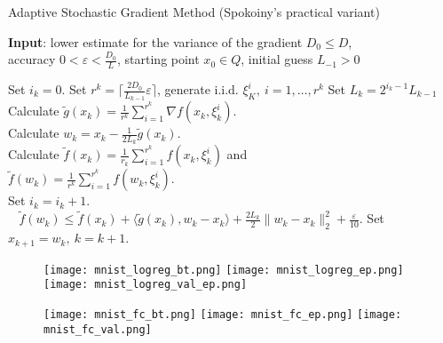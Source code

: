 \documentclass[a4paper,12pt]{article}
\theoremstyle{plain} %
\theoremstyle{definition} %
\theoremstyle{remark} %
\theoremstyle{definition}
\theoremstyle{definition}
\let\epsilon\varepsilon
\begin{document}
	\begin{algorithm}[h!]
		\caption{Adaptive Stochastic Gradient Method (Spokoiny's practical variant)}
		\hspace*{\algorithmicindent} \textbf{Input}: lower estimate for the variance of the gradient $D_0 \le D$,\\ accuracy $0 < \varepsilon< \frac{D_0}{L}$, starting point $x_0 \in Q$, initial guess $L_{-1} > 0$
		\label{RKalg}
		\begin{algorithmic}[1] 
			\STATE Set $i_k=0$. Set $r^k = \lceil \frac{2 D_0}{L_{k-1}} {\varepsilon}\rceil$, generate i.i.d. $\xi^i_K, ~i = 1,\dots, r^k$
			\REPEAT
			\STATE Set $L_k = 2 ^{i_k-1}L_{k-1}$
			\\
			\STATE Calculate $\tilde{g}(x_k) = \frac{1}{r^k}\sum_{i=1}^{r^k}\nabla f(x_k, \xi^i_k)$.
			\\
			\STATE Calculate $w_k = x_k - \frac{1}{2 L_k}\tilde{g}(x_k)$.
			\\
			\STATE Calculate $\tilde{f}(x_k) = \frac{1}{r_k}\sum_{i=1}^{r^k}f(x_k, \xi^i_k)$ and\\ $\tilde{f}(w_k) = \frac{1}{r^k}\sum_{i=1}^{r^k}f(w_k, \xi^i_k)$.
			\\
			\STATE Set $i_k = i_k + 1$.
			\UNTIL \\$~~~~\tilde{f}(w_k) \le \tilde{f}(x_k) + \langle\tilde{g}(x_k), w_k - x_k\rangle + \frac{2 L_k}{2}\|w_k - x_k\|_2^2 + \frac{\epsilon}{10}$.
			\STATE Set $x_{k+1} = w_k,~k=k+1$.
			\ENDFOR
		\end{algorithmic}
	\end{algorithm}
	
	
	
	\newpage
	
	\begin{figure}[!htb]
		\texttt{[image: mnist\_logreg\_bt.png]}
		\endminipage\hfill
		\texttt{[image: mnist\_logreg\_ep.png]}
		\endminipage\hfill
		\texttt{[image: mnist\_logreg\_val\_ep.png]}
		\endminipage
	\end{figure}
	
	\begin{figure}[!htb]
		\texttt{[image: mnist\_fc\_bt.png]}
		\endminipage\hfill
		\texttt{[image: mnist\_fc\_ep.png]}
		\endminipage\hfill
		\texttt{[image: mnist\_fc\_val.png]}
		\endminipage
	\end{figure}
	
\end{document}
